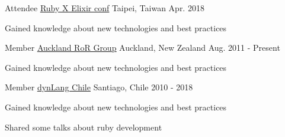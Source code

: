 

\begin{cventries}

  \cventry
    {Attendee} %
    {\href{https://2018.rubyconf.tw/}{\underline{Ruby X Elixir conf}}} %
    {Taipei, Taiwan} %
    {Apr. 2018} %
    {
      \begin{cvitems} %
        \item {Gained knowledge about new technologies and best practices}
      \end{cvitems}
    }

  \cventry
    {Member} %
    {\href{http://www.meetup.com/aucklandrails/}{\underline{Auckland RoR Group}}} %
    {Auckland, New Zealand} %
    {Aug. 2011 - Present} %
    {
      \begin{cvitems} %
        \item {Gained knowledge about new technologies and best practices}
      \end{cvitems}
    }

  \cventry
    {Member} %
    {\href{http://www.meetup.com/dynlangchile/}{\underline{dynLang Chile}}} %
    {Santiago, Chile} %
    {2010 - 2018} %
    {
      \begin{cvitems} %
        \item {Gained knowledge about new technologies and best practices}
        \item {Shared some talks about ruby development}
      \end{cvitems}
    }


\end{cventries}
